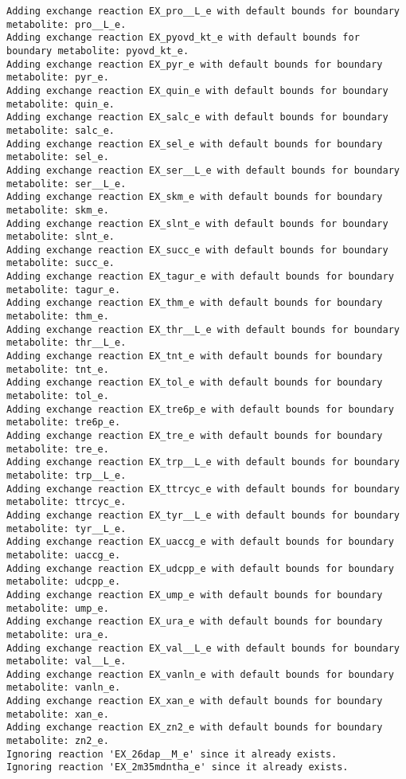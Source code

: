 \documentclass[
  letterpaper,
  DIV=11,
  numbers=noendperiod]{scrartcl}
\begin{document}
\begin{verbatim}
Adding exchange reaction EX_pro__L_e with default bounds for boundary metabolite: pro__L_e.
Adding exchange reaction EX_pyovd_kt_e with default bounds for boundary metabolite: pyovd_kt_e.
Adding exchange reaction EX_pyr_e with default bounds for boundary metabolite: pyr_e.
Adding exchange reaction EX_quin_e with default bounds for boundary metabolite: quin_e.
Adding exchange reaction EX_salc_e with default bounds for boundary metabolite: salc_e.
Adding exchange reaction EX_sel_e with default bounds for boundary metabolite: sel_e.
Adding exchange reaction EX_ser__L_e with default bounds for boundary metabolite: ser__L_e.
Adding exchange reaction EX_skm_e with default bounds for boundary metabolite: skm_e.
Adding exchange reaction EX_slnt_e with default bounds for boundary metabolite: slnt_e.
Adding exchange reaction EX_succ_e with default bounds for boundary metabolite: succ_e.
Adding exchange reaction EX_tagur_e with default bounds for boundary metabolite: tagur_e.
Adding exchange reaction EX_thm_e with default bounds for boundary metabolite: thm_e.
Adding exchange reaction EX_thr__L_e with default bounds for boundary metabolite: thr__L_e.
Adding exchange reaction EX_tnt_e with default bounds for boundary metabolite: tnt_e.
Adding exchange reaction EX_tol_e with default bounds for boundary metabolite: tol_e.
Adding exchange reaction EX_tre6p_e with default bounds for boundary metabolite: tre6p_e.
Adding exchange reaction EX_tre_e with default bounds for boundary metabolite: tre_e.
Adding exchange reaction EX_trp__L_e with default bounds for boundary metabolite: trp__L_e.
Adding exchange reaction EX_ttrcyc_e with default bounds for boundary metabolite: ttrcyc_e.
Adding exchange reaction EX_tyr__L_e with default bounds for boundary metabolite: tyr__L_e.
Adding exchange reaction EX_uaccg_e with default bounds for boundary metabolite: uaccg_e.
Adding exchange reaction EX_udcpp_e with default bounds for boundary metabolite: udcpp_e.
Adding exchange reaction EX_ump_e with default bounds for boundary metabolite: ump_e.
Adding exchange reaction EX_ura_e with default bounds for boundary metabolite: ura_e.
Adding exchange reaction EX_val__L_e with default bounds for boundary metabolite: val__L_e.
Adding exchange reaction EX_vanln_e with default bounds for boundary metabolite: vanln_e.
Adding exchange reaction EX_xan_e with default bounds for boundary metabolite: xan_e.
Adding exchange reaction EX_zn2_e with default bounds for boundary metabolite: zn2_e.
Ignoring reaction 'EX_26dap__M_e' since it already exists.
Ignoring reaction 'EX_2m35mdntha_e' since it already exists.

\end{verbatim}
\end{document}
